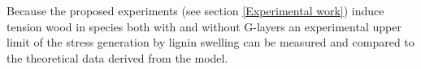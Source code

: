 Because the proposed experiments (see section \ref{Experimental work}) induce tension wood in species
both with and without G-layers an experimental upper limit of the stress
generation by lignin swelling can be measured and
compared to the theoretical data derived from the model.